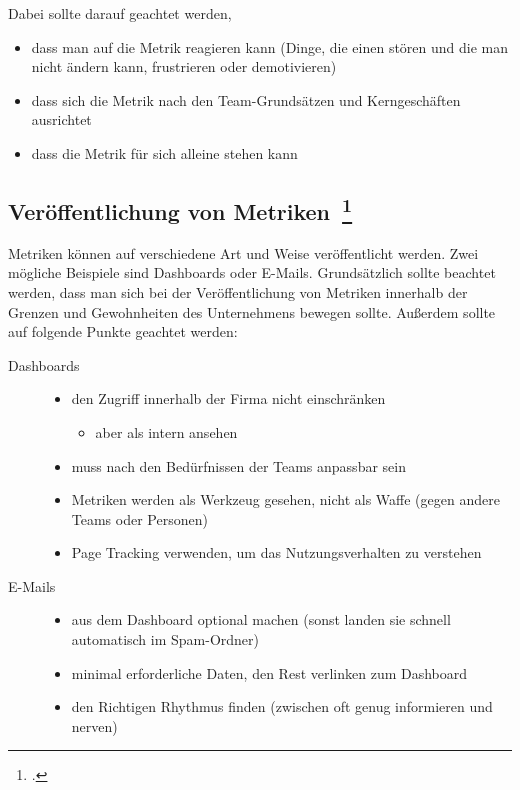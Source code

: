 Dabei sollte darauf geachtet werden,
\begin{itemize}
  \item dass man auf die Metrik reagieren kann (Dinge, die einen stören und die man nicht ändern kann, frustrieren oder demotivieren)
  \item dass sich die Metrik nach den Team-Grundsätzen und Kerngeschäften ausrichtet
  \item dass die Metrik für sich alleine stehen kann
\end{itemize}

\subsection[Veröffentlichung von Metriken]{Veröffentlichung von Metriken~\footcite[vgl.][S.177ff]{davis_agile_2015}}

Metriken können auf verschiedene Art und Weise veröffentlicht werden. Zwei mögliche Beispiele sind Dashboards oder E-Mails.
Grundsätzlich sollte beachtet werden, dass man sich bei der Veröffentlichung von Metriken innerhalb der Grenzen und Gewohnheiten des Unternehmens bewegen sollte.
Außerdem sollte auf folgende Punkte geachtet werden:

\begin{description}
  \item[Dashboards] \hfill
  \begin{itemize}[noitemsep]
    \item den Zugriff innerhalb der Firma nicht einschränken
    \begin{itemize}[noitemsep]
      \item aber als intern ansehen
    \end{itemize}
    \item muss nach den Bedürfnissen der Teams anpassbar sein
    \item Metriken werden als Werkzeug gesehen, nicht als Waffe (gegen andere Teams oder Personen)
    \item Page Tracking verwenden, um das Nutzungsverhalten zu verstehen
  \end{itemize}
  \item[E-Mails] \hfill
  \begin{itemize}[noitemsep]
    \item aus dem Dashboard optional machen (sonst landen sie schnell automatisch im Spam-Ordner)
    \item minimal erforderliche Daten, den Rest verlinken zum Dashboard
    \item den Richtigen Rhythmus finden (zwischen oft genug informieren und nerven)
  \end{itemize}
\end{description}

